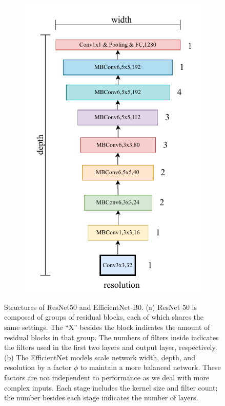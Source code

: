 \documentclass[conference]{IEEEtran}
\begin{document}
\begin{figure}[!t]
	\begin{subfigure}{0.4\textwidth}
		\centering
		\includegraphics[scale=0.5]{arch-efficientnet}
		\caption{}
		\label{fig:efficientnet}
	\end{subfigure}
	\caption{Structures of ResNet50 and EfficientNet-B0. (a) ResNet 50 is composed of groups
			of residual blocks, each of which shares the same settings. The ``X'' besides the 
			block indicates the amount of residual blocks in that group. The numbers of filters
			inside indicates the filters used in the first two layers and output layer, respectively.
	(b) The EfficientNet models scale network width, depth, and resolution by a 
	factor $\phi$ to maintain a more balanced network. These factors are not
	independent to performance as we deal with more complex inputs. 
	Each stage includes the kernel size and filter count; the number besides
	each stage indicates the number of layers.}
	\label{fig:architectures}
\end{figure}
\end{document}
